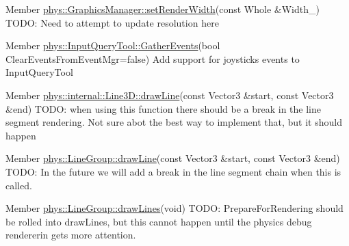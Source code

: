 \label{dd/da0/todo__todo000013}
\hypertarget{dd/da0/todo__todo000013}{}
 
\begin{DoxyDescription}
\item[Member \hyperlink{classphys_1_1GraphicsManager_aea5fb5808a23fa29c8522c396ac0d6b5}{phys::GraphicsManager::setRenderWidth}(const Whole \&Width\_\-) ]TODO: Need to attempt to update resolution here 
\end{DoxyDescription}

\label{dd/da0/todo__todo000015}
\hypertarget{dd/da0/todo__todo000015}{}
 
\begin{DoxyDescription}
\item[Member \hyperlink{classphys_1_1InputQueryTool_a9779d812418f1fddb0880df0c607242b}{phys::InputQueryTool::GatherEvents}(bool ClearEventsFromEventMgr=false) ]Add support for joysticks events to InputQueryTool 
\end{DoxyDescription}

\label{dd/da0/todo__todo000016}
\hypertarget{dd/da0/todo__todo000016}{}
 
\begin{DoxyDescription}
\item[Member \hyperlink{classphys_1_1internal_1_1Line3D_a31bf19dc06547cbe042e1ddfbcf672f3}{phys::internal::Line3D::drawLine}(const Vector3 \&start, const Vector3 \&end) ]TODO: when using this function there should be a break in the line segment rendering. Not sure abot the best way to implement that, but it should happen 
\end{DoxyDescription}

\label{dd/da0/todo__todo000018}
\hypertarget{dd/da0/todo__todo000018}{}
 
\begin{DoxyDescription}
\item[Member \hyperlink{classphys_1_1LineGroup_a141db62ea17d94b9bce421e5df5a8d89}{phys::LineGroup::drawLine}(const Vector3 \&start, const Vector3 \&end) ]TODO: In the future we will add a break in the line segment chain when this is called. 
\end{DoxyDescription}

\label{dd/da0/todo__todo000019}
\hypertarget{dd/da0/todo__todo000019}{}
 
\begin{DoxyDescription}
\item[Member \hyperlink{classphys_1_1LineGroup_ade1bb4f8e1164e1b8d7aeabbc970b79d}{phys::LineGroup::drawLines}(void) ]TODO: PrepareForRendering should be rolled into drawLines, but this cannot happen until the physics debug rendererin gets more attention. 
\end{DoxyDescription}

